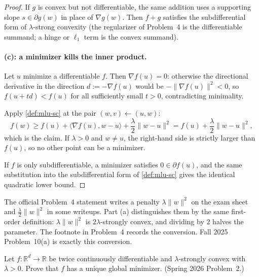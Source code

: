 \begin{proof}
If $g$ is convex but not differentiable, the same addition uses a supporting slope $s\in\partial g(w)$ in place of $\nabla g(w)$. Then $f+g$ satisfies the subdifferential form of $\lambda$-strong convexity (the regularizer of Problem~4 is the differentiable summand; a hinge or $\ell_1$ term is the convex summand).

\paragraph{(c): a minimizer kills the inner product.}
Let $u$ minimize a differentiable $f$. Then $\nabla f(u)=0$: otherwise the directional derivative in the direction $d:=-\nabla f(u)$ would be $-\lVert\nabla f(u)\rVert^2<0$, so $f(u+td)<f(u)$ for all sufficiently small $t>0$, contradicting minimality.

Apply \cref{def:mlu-sc} at the pair $(w,v)\leftarrow(u,w)$:
\[
f(w)
\ge
f(u)+\langle\nabla f(u),w-u\rangle+\frac{\lambda}{2}\lVert w-u\rVert^2
=
f(u)+\frac{\lambda}{2}\lVert w-u\rVert^2,
\]
which is the claim. If $\lambda>0$ and $w\ne u$, the right-hand side is strictly larger than $f(u)$, so no other point can be a minimizer.

If $f$ is only subdifferentiable, a minimizer satisfies $0\in\partial f(u)$, and the same substitution into the subdifferential form of \cref{def:mlu-sc} gives the identical quadratic lower bound.
\end{proof}

\begin{remark}
The official Problem~4 statement writes a penalty $\lambda\lVert w\rVert^2$ on the exam sheet and $\tfrac{\lambda}{2}\lVert w\rVert^2$ in some writeups. Part (a) distinguishes them by the same first-order definition: $\lambda\lVert w\rVert^2$ is $2\lambda$-strongly convex, and dividing by $2$ halves the parameter. The footnote in Problem~4 records the conversion. Fall 2025 Problem~10(a) is exactly this conversion.
\end{remark}

\begin{exercise}
\label{ex:mlu-unique}
Let $f:\mathbb{R}^d\to\mathbb{R}$ be twice continuously differentiable and $\lambda$-strongly convex with $\lambda>0$. Prove that $f$ has a unique global minimizer. (Spring 2026 Problem~2.)
\end{exercise}

